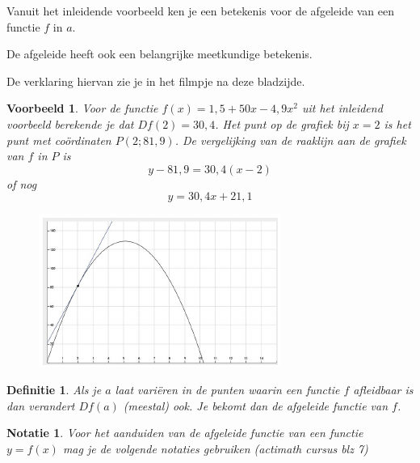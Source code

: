 \documentclass{article}
\newtheorem*{definitie}{Definitie} \newtheorem*{notatie}{Notatie} \newtheorem*{voorbeeld}{Voorbeeld}
\begin{document}
\noindent Vanuit het inleidende voorbeeld ken je een betekenis voor de afgeleide van een functie $f$ in $a$.\vspace{0,2 cm}

\vspace{0,5 cm}

\noindent De afgeleide heeft ook een belangrijke meetkundige betekenis.\vspace{0,2 cm}

\vspace{0,2 cm}

De verklaring hiervan zie je in het filmpje na deze bladzijde.

\begin{voorbeeld}
Voor de functie $f(x)=1,5+50 x -4,9 x^2$ uit het inleidend voorbeeld berekende je dat $Df(2)=30,4$.
Het punt op de grafiek bij $x=2$ is het punt met co\"ordinaten $P(2;81,9)$.
De vergelijking van de raaklijn aan de grafiek van $f$ in $P$ is
\[
y-81,9=30,4(x-2)
\]
of nog
\[
y=30,4x+21,1
\]

\begin{figure}[h]
\begin{center}
\includegraphics[height=5 cm]{grafTang.JPG}
\end{center}
\end{figure}
\end{voorbeeld}\vspace{0,5 cm}

\begin{definitie}
Als je $a$ laat vari\"eren in de punten waarin een functie $f$ afleidbaar is dan verandert $Df(a)$ (meestal) ook.
Je bekomt dan de afgeleide functie van $f$.
\end{definitie}

\begin{notatie}
Voor het aanduiden van de afgeleide functie van een functie $y=f(x)$ mag je de volgende notaties gebruiken (actimath cursus blz 7)
\end{notatie}
\end{document}
